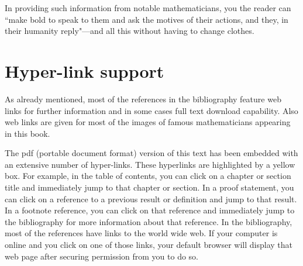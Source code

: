 In providing such information from notable mathematicians, you the reader can
``make bold to speak to them and ask the motives of their actions,
        and they, in their humanity reply"---and all this without having to change clothes.

\section*{Hyper-link support}
As already mentioned, most of the references in the bibliography feature web links
for further information and in some cases full text download capability.
Also web links are given for most of the images of
famous mathematicians appearing in this book.

The pdf (portable document format) version of this text has
been embedded with an extensive number of hyper-links.
These hyperlinks are highlighted by a yellow box.
For example, in the table of contents,
you can click on a chapter or section title and immediately jump to that chapter or section.
In a proof statement, you can click on a reference to a previous result or definition
and jump to that result.
In a footnote reference, you can click on that reference and immediately jump
to the bibliography for more information about that reference.
In the bibliography, most of the references have links to the world wide web.
If your computer is online and you click on one of those links,
your default browser will display that web page after securing permission from you to do so.


